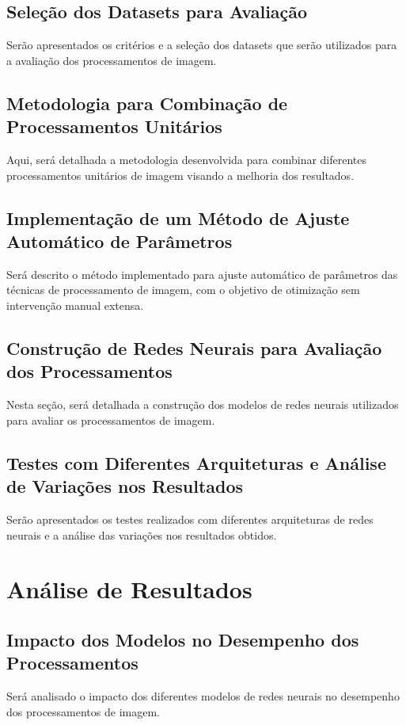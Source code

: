 \section{Seleção dos Datasets para Avaliação}
Serão apresentados os critérios e a seleção dos datasets que serão utilizados para a avaliação dos processamentos de imagem.

\section{Metodologia para Combinação de Processamentos Unitários}
Aqui, será detalhada a metodologia desenvolvida para combinar diferentes processamentos unitários de imagem visando a melhoria dos resultados.

\section{Implementação de um Método de Ajuste Automático de Parâmetros}
Será descrito o método implementado para ajuste automático de parâmetros das técnicas de processamento de imagem, com o objetivo de otimização sem intervenção manual extensa.

\section{Construção de Redes Neurais para Avaliação dos Processamentos}
Nesta seção, será detalhada a construção dos modelos de redes neurais utilizados para avaliar os processamentos de imagem.

\section{Testes com Diferentes Arquiteturas e Análise de Variações nos Resultados}
Serão apresentados os testes realizados com diferentes arquiteturas de redes neurais e a análise das variações nos resultados obtidos.

\chapter{Análise de Resultados}
\section{Impacto dos Modelos no Desempenho dos Processamentos}
Será analisado o impacto dos diferentes modelos de redes neurais no desempenho dos processamentos de imagem.

